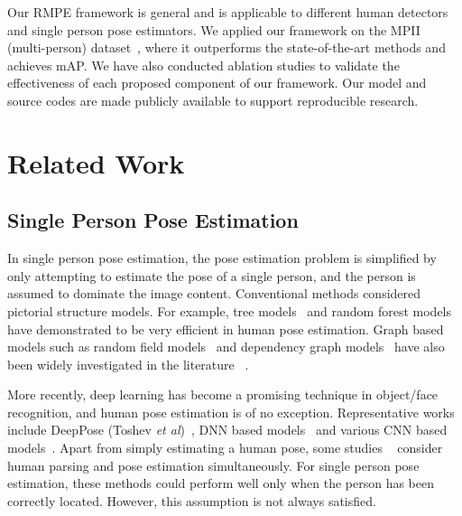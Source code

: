 \documentclass[10pt,twocolumn,letterpaper]{article}
\begin{document}
Our RMPE framework is general and is applicable to different human detectors and single person pose estimators. We applied our framework on the MPII (multi-person) dataset~\cite{andriluka14cvpr}, where it outperforms the state-of-the-art methods and achieves  mAP. We have also conducted ablation studies to validate the effectiveness of each proposed component of our framework. Our model and source codes are made publicly available to support reproducible research.

\section{Related Work}\label{sec:related_work}


\subsection{Single Person Pose Estimation}
In single person pose estimation, the pose estimation problem is simplified by only attempting to estimate the pose of a single person, and the person is assumed to dominate the image content. Conventional methods considered pictorial structure models. For example, tree models~\cite{ wang2008multiple,sapp2010cascaded,zhang2009efficient,wang2013beyond} and random forest models ~\cite{sun2012conditional,dantone2013human} have demonstrated to be very efficient in human pose estimation.
Graph based models such as random field models~\cite{kiefel2014human} and dependency graph models~\cite{hara2013computationally} have also been widely investigated in the literature
~\cite{gupta2008context,sun2012efficient,ladicky2013human,pishchulin2013strong}.

More recently, deep learning has become a promising technique in object/face recognition, and human pose estimation is of no exception. Representative works include DeepPose (Toshev \emph{et al})~\cite{toshev2014deeppose}, DNN based models~\cite{Ouyang_2014_CVPR,fan2015combining} and various CNN based models~\cite{jain2013learning,tompson2014joint,newell2016stacked,belagiannis2016recurrent,wei2016convolutional}.
Apart from simply estimating a human pose, some studies ~\cite{dong2014towards,park2015attributed} consider human parsing
and pose estimation simultaneously. For single person pose estimation, these methods could perform well only when the person has been correctly located. However, this assumption is not always satisfied.
\end{document}
